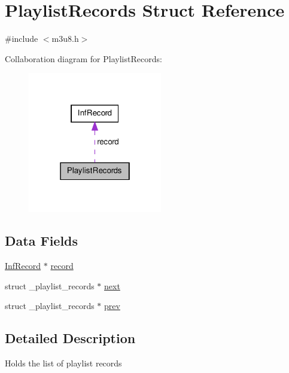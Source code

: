 \hypertarget{struct_playlist_records}{\section{\-Playlist\-Records \-Struct \-Reference}
\label{struct_playlist_records}
}


{\ttfamily \#include $<$m3u8.\-h$>$}



\-Collaboration diagram for \-Playlist\-Records\-:
\nopagebreak
\begin{figure}[H]
\begin{center}
\leavevmode
\includegraphics[width=166pt]{struct_playlist_records__coll__graph}
\end{center}
\end{figure}
\subsection*{\-Data \-Fields}
\begin{DoxyCompactItemize}
\item 
\hyperlink{struct_inf_record}{\-Inf\-Record} $\ast$ \hyperlink{struct_playlist_records_a6d58e7a65bc9b1e859cb3bf645693c58}{record}
\item 
struct \-\_\-playlist\-\_\-records $\ast$ \hyperlink{struct_playlist_records_afa50efa7cc40de2ed624be01796ecc5a}{next}
\item 
struct \-\_\-playlist\-\_\-records $\ast$ \hyperlink{struct_playlist_records_a44bec84a5d3a4fe698154f605af3d85e}{prev}
\end{DoxyCompactItemize}


\subsection{\-Detailed \-Description}
\-Holds the list of playlist records 

